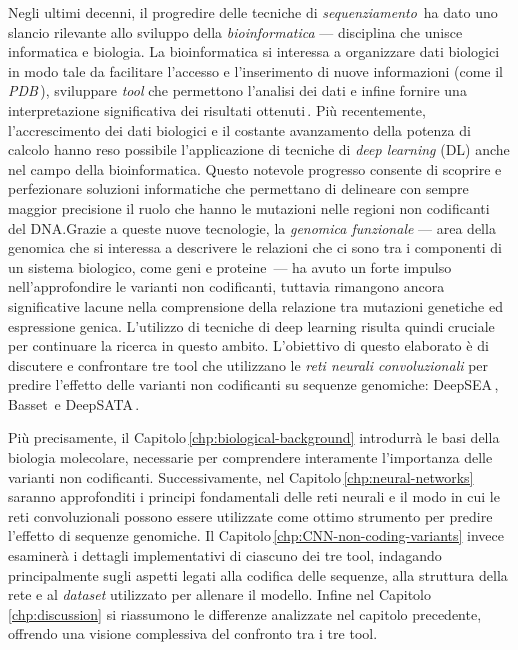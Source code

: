 Negli ultimi decenni, il progredire delle tecniche di \textsl{sequenziamento}\,\cite{pareek2011sequencing} ha dato uno slancio rilevante allo sviluppo della \textsl{bioinformatica} — disciplina che unisce informatica e biologia. La bioinformatica si interessa a organizzare dati biologici in modo tale da facilitare l'accesso e l'inserimento di nuove informazioni (come il \textsl{PDB}\,\cite{burley2017protein}), sviluppare \textsl{tool} che permettono l'analisi dei dati e infine fornire una interpretazione significativa dei risultati ottenuti\,\cite{luscombe2001bioinformatics}. Più recentemente, l'accrescimento dei dati biologici e il costante avanzamento della potenza di calcolo hanno reso possibile l'applicazione di tecniche di \textsl{deep learning} (\acs{DL}) anche nel campo della bioinformatica. Questo notevole progresso consente di scoprire e perfezionare soluzioni informatiche che permettano di delineare con sempre maggior precisione il ruolo che hanno le mutazioni nelle regioni non codificanti del \acs{DNA}.\@ Grazie a queste nuove tecnologie, la \textsl{genomica funzionale} — area della genomica che si interessa a descrivere le relazioni che ci sono tra i componenti di un sistema biologico, come geni e proteine\,\cite{caudai2021ai} — ha avuto un forte impulso nell'approfondire le varianti non codificanti, tuttavia rimangono ancora significative lacune nella comprensione della relazione tra mutazioni genetiche ed espressione genica. L'utilizzo di tecniche di deep learning risulta quindi cruciale per continuare la ricerca in questo ambito. L'obiettivo di questo elaborato è di discutere e confrontare tre tool che utilizzano le \textsl{reti neurali convoluzionali} per predire l'effetto delle varianti non codificanti su sequenze genomiche: DeepSEA\,\cite{zhou2015predicting}, Basset\,\cite{kelley2016basset} e DeepSATA\,\cite{ma2023deepsata}.

Più precisamente, il Capitolo\,\ref{chp:biological-background} introdurrà le basi della biologia molecolare, necessarie per comprendere interamente l'importanza delle varianti non codificanti. Successivamente, nel Capitolo\,\ref{chp:neural-networks} saranno approfonditi i principi fondamentali delle reti neurali e il modo in cui le reti convoluzionali possono essere utilizzate come ottimo strumento per predire l'effetto di sequenze genomiche. Il Capitolo\,\ref{chp:CNN-non-coding-variants} invece esaminerà i dettagli implementativi di ciascuno dei tre tool, indagando principalmente sugli aspetti legati alla codifica delle sequenze, alla struttura della rete e al \textsl{dataset} utilizzato per allenare il modello. Infine nel Capitolo\,\ref{chp:discussion} si riassumono le differenze analizzate nel capitolo precedente, offrendo una visione complessiva del confronto tra i tre tool.

